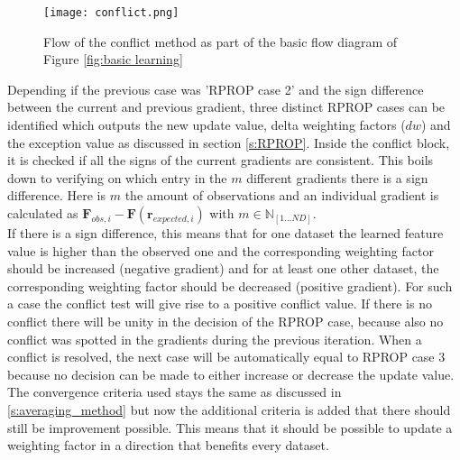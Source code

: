   \begin{figure}[h!]
 	\centering
 	\texttt{[image: conflict.png]}
 	\caption{Flow of the conflict method as part of the basic flow diagram of Figure \ref{fig:basic learning}}
 	\label{fig:conflict}
 \end{figure}

Depending if the previous case was 'RPROP case 2' and the sign difference between the current and previous gradient, three distinct RPROP cases can be identified which outputs the new update value, delta weighting factors ($dw$) and the exception value as discussed in section \ref{s:RPROP}. Inside the conflict block, it is checked if all the signs of the current gradients are consistent. This boils down to verifying on which entry in the $m$ different gradients there is a sign difference. Here is $m$ the amount of observations and an individual gradient is calculated as  $\bm{F}_{obs,i} - \bm{F}(\bm{r}_{expected,i})$ with $m \in \mathbb{N}_{[1\dots ND]}$. \\ 

If there is a sign difference, this means that for one dataset the learned feature value is higher than the observed one and the corresponding weighting factor should be increased (negative gradient) and for at least one other dataset, the corresponding weighting factor should be decreased (positive gradient). For such a case the conflict test will give rise to a positive conflict value. If there is no conflict there will be unity in the decision of the RPROP case, because also no conflict was spotted in the gradients during the previous iteration. When a conflict is resolved, the next case will be automatically equal to RPROP case 3 because no decision can be made to either increase or decrease the update value. The convergence criteria used stays the same as discussed in \ref{s:averaging_method} but now the additional criteria is added that there should still be improvement possible. This means that it should be possible to update a weighting factor in a direction that benefits every dataset.\\

